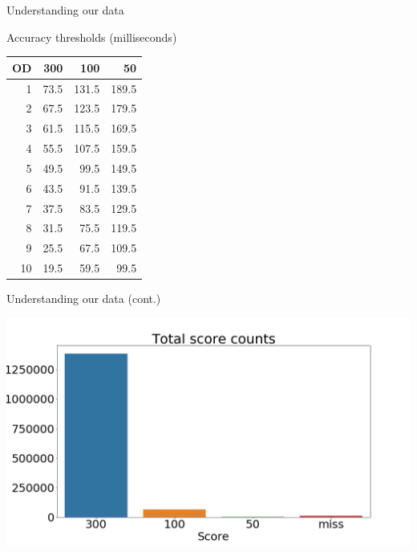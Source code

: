 \documentclass[table]{beamer}
\begin{document}
\begin{frame}{Understanding our data}
  \begin{block}{Accuracy thresholds (milliseconds)}
    \begin{center}
      \begin{tabular}{r | r r r}
        OD & 300 & 100 & 50 \\
        \hline
        1 & 73.5 & 131.5 & 189.5 \\
        2 & 67.5 & 123.5 & 179.5 \\
        3 & 61.5 & 115.5 & 169.5 \\
        4 & 55.5 & 107.5 & 159.5 \\
        5 & 49.5 & 99.5 & 149.5 \\
        6 & 43.5 & 91.5 & 139.5 \\
        7 & 37.5 & 83.5 & 129.5 \\
        8 & 31.5 & 75.5 & 119.5 \\
        9 & 25.5 & 67.5 & 109.5 \\
        10 & 19.5 & 59.5 & 99.5
      \end{tabular}
    \end{center}
  \end{block}
\end{frame}

\begin{frame}{Understanding our data (cont.)}
  \begin{center}
    \includegraphics[width=1.00\textwidth]{images/hit-counts.png}
  \end{center}
\end{frame}
\end{document}
